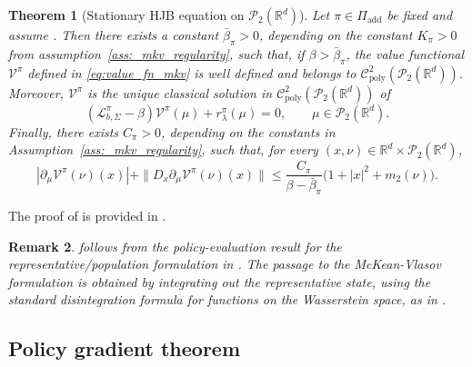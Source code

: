 \documentclass[a4paper, 10pt, english, reqno]{amsart}
\newtheorem{theorem}{Theorem}[section]
\newtheorem{remark}[theorem]{Remark}
\begin{document}
\begin{theorem}[Stationary HJB equation on $\mathcal P_2(\mathbb R^d)$]
\label{thm:MF_eval_infinite_mkv}
Let $\pi\in\Pi_{\mathrm{add}}$ be fixed and assume . Then there exists a constant $\bar\beta_\pi>0$, depending on the constant $K_\pi>0$ from assumption~\ref{ass:_mkv_regularity}, such that, if $\beta>\bar\beta_\pi$, the value functional $\mathcal V^\pi$ defined in \eqref{eq:value_fn_mkv} is well defined and belongs to $\mathcal C^2_{\mathrm{poly}}(\mathcal P_2(\mathbb R^d))$. Moreover, $\mathcal V^\pi$ is the unique classical solution in $\mathcal C^2_{\mathrm{poly}}(\mathcal P_2(\mathbb R^d))$ of
\begin{equation}
\label{eq:HJB-eval-mkv}
  (\mathcal L_{b,\Sigma}^{\pi}-\beta)\mathcal V^\pi(\mu)
  + r_\lambda^\pi(\mu)=0,
  \qquad
  \mu\in\mathcal P_2(\mathbb R^d).
\end{equation}
Finally, there exists $C_\pi>0$, depending on the constants in
Assumption~\ref{ass:_mkv_regularity}, such that, for every
$(x,\nu)\in\mathbb R^d\times\mathcal P_2(\mathbb R^d)$,
\begin{equation}
\label{eq:value-derivative-bound-mkv}
|\partial_\mu\mathcal{V}^\pi(\nu)(x)|
+
\|D_x\partial_\mu\mathcal{V}^\pi(\nu)(x)\|
\le
\frac{C_\pi}{\beta-\bar\beta_\pi}
\bigl(1+|x|^2+m_2(\nu)\bigr).
\end{equation}
\end{theorem}


The proof of  is provided in .
\begin{remark}
\label{rem:hjb-from-coupled-system}
 follows from the policy-evaluation result for the representative/population formulation in \cite{firstpaper}. The passage to the McKean-Vlasov formulation is obtained by integrating out the representative state, using the standard disintegration formula for functions on the Wasserstein space, as in \cite{BayraktarCossoPham2018}.
\end{remark}



\subsection{Policy gradient theorem}
\label{subsec:mkv-policy-gradient}
\end{document}
